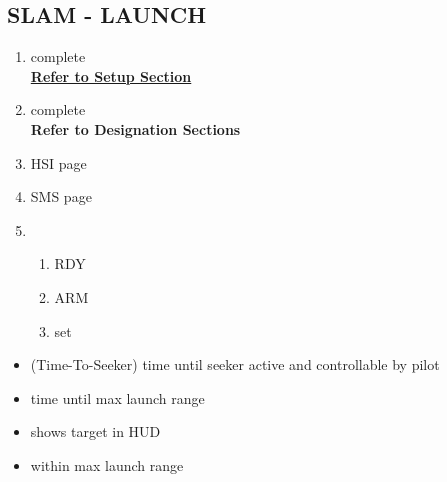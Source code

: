 \documentclass[fontInter, widesubsec]{TechCheck}
\begin{document}
	\subsection{SLAM - LAUNCH}
	\label{subsec:84launch}
	\begin{enumerate}
		\item {}\dotfill complete \\
		\hfill \hyperref[subsec:84setup]{\textbf{Refer to Setup Section}}
		\item {}\dotfill complete \\
		\hfill \textbf{Refer to Designation Sections}
		\item {}\dotfill HSI page
		\item {}\dotfill SMS page
		\item {}
		\begin{enumerate}
			\item {}\dotfill RDY
			\item {}\dotfill ARM
			\item {}\dotfill set
		\end{enumerate}
	\end{enumerate}
	\thumbnar
		\begin{itemize}
			\item {} (Time-To-Seeker) time until seeker active and controllable by pilot
			\item {} time until max launch range
			\item {} shows target in HUD
			\item {} within max launch range
		\end{itemize}
\end{document}
